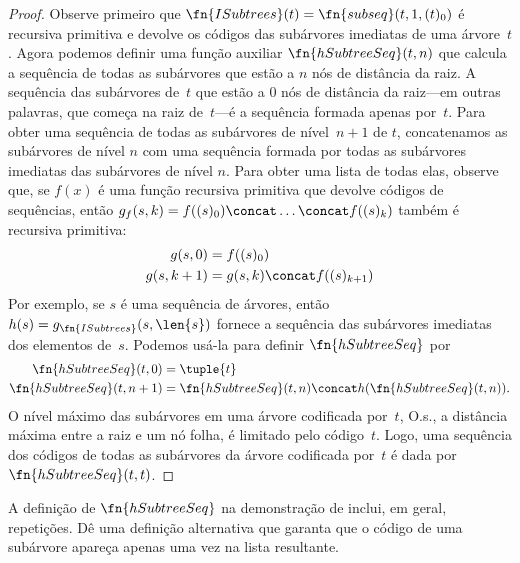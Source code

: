 \documentclass[../../../include/open-logic-section]{subfiles}
\begin{document}
\begin{proof}
  Observe primeiro que $\fn{ISubtrees}(t) = \fn{subseq}(t, 1, (t)_0)$
  é recursiva primitiva e devolve os códigos das subárvores imediatas
  de uma árvore~$t$. Agora podemos definir uma função auxiliar
  $\fn{hSubtreeSeq}(t,n)$ que calcula a sequência de todas as subárvores
  que estão a $n$ nós de distância da raiz. A sequência das subárvores
  de~$t$ que estão a $0$ nós de distância da raiz---em outras palavras,
  que começa na raiz de~$t$---é a sequência formada apenas por~$t$.
  Para obter uma sequência de todas as subárvores de nível~$n+1$ de
  $t$, concatenamos as subárvores de nível $n$ com uma sequência formada
  por todas as subárvores imediatas das subárvores de nível $n$. Para
  obter uma lista de todas elas, observe que, se $f(x)$ é uma função
  recursiva primitiva que devolve códigos de sequências, então
  $g_f(s, k) = f((s)_0) \concat \dots \concat f((s)_k)$ também é
  recursiva primitiva:
    \begin{align*}
      g(s, 0) & = f((s)_0)\\
      g(s, k+1) & = g(s, k) \concat f((s)_{k+1})
    \end{align*}
    Por exemplo, se $s$ é uma sequência de árvores, então
    $h(s) = g_{\fn{ISubtrees}}(s, \len{s})$ fornece a sequência das
    subárvores imediatas dos elementos de~$s$. Podemos usá-la para
    definir $\fn{hSubtreeSeq}$ por
    \begin{align*}
      \fn{hSubtreeSeq}(t, 0) & = \tuple{t} \\
      \fn{hSubtreeSeq}(t, n+1) & = \fn{hSubtreeSeq}(t, n) \concat
      h(\fn{hSubtreeSeq}(t, n)).
    \end{align*}
    O nível máximo das subárvores em uma árvore codificada por~$t$,
    O.s.\@, a distância máxima entre a raiz e um nó folha, é limitado
    pelo código~$t$. Logo, uma sequência dos códigos de todas as
    subárvores da árvore codificada por~$t$ é dada por
    $\fn{hSubtreeSeq}(t, t)$.
\end{proof}

\begin{prob}
  A definição de $\fn{hSubtreeSeq}$ na demonstração de
   inclui, em geral,
  repetições. Dê uma definição alternativa que garanta que o código
  de uma subárvore apareça apenas uma vez na lista resultante.
\end{prob}
\end{document}
